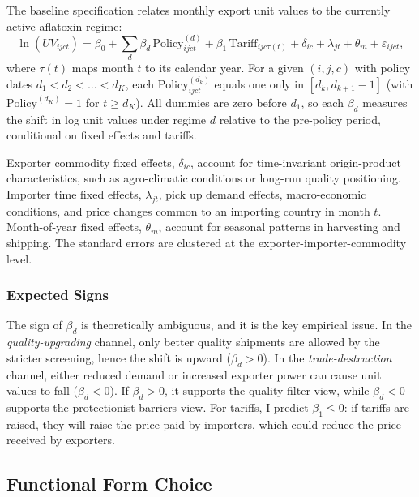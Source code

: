 \documentclass[12pt]{article}
\begin{document}
The baseline specification relates monthly export unit values to the currently active aflatoxin regime:
\begin{equation}
\label{eq:baseline_uv}
\ln\!\left(UV_{ijct}\right)
= \beta_0
+ \sum_{d} \beta_d \,\text{Policy}_{ijct}^{(d)}
+ \beta_1 \,\text{Tariff}_{ijc\tau(t)}
+ \delta_{ic}
+ \lambda_{jt}
+ \theta_m
+ \varepsilon_{ijct},
\end{equation}
where $\tau(t)$ maps month $t$ to its calendar year. For a given $(i,j,c)$ with policy dates $d_1 < d_2 < \dots < d_K$, each $\text{Policy}_{ijct}^{(d_k)}$ equals one only in $[d_k, d_{k+1}-1]$ (with $\text{Policy}^{(d_K)}=1$ for $t \geq d_K$). All dummies are zero before $d_1$, so each $\beta_d$ measures the shift in log unit values under regime $d$ relative to the pre-policy period, conditional on fixed effects and tariffs.

Exporter commodity fixed effects, $\delta_{ic}$, account for time-invariant origin-product characteristics, such as agro-climatic conditions or long-run quality positioning. Importer time fixed effects, $\lambda_{jt}$, pick up demand effects, macro-economic conditions, and price changes common to an importing country in month $t$. Month-of-year fixed effects, $\theta_m$, account for seasonal patterns in harvesting and shipping. The standard errors are clustered at the exporter-importer-commodity level.

\subsubsection*{Expected Signs}

The sign of $\beta_d$ is theoretically ambiguous, and it is the key empirical issue. In the \textit{quality-upgrading} channel, only better quality shipments are allowed by the stricter screening, hence the shift is upward ($\beta_d > 0$). In the \textit{trade-destruction} channel, either reduced demand or increased exporter power can cause unit values to fall ($\beta_d < 0$). If $\beta_d > 0$, it supports the quality-filter view, while $\beta_d < 0$ supports the protectionist barriers view. For tariffs, I predict $\beta_1 \leq 0$: if tariffs are raised, they will raise the price paid by importers, which could reduce the price received by exporters.

\subsection{Functional Form Choice}
\end{document}
